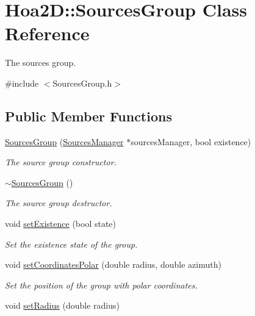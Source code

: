 \hypertarget{class_hoa2_d_1_1_sources_group}{\section{Hoa2\-D\-:\-:Sources\-Group Class Reference}
\label{class_hoa2_d_1_1_sources_group}
}


The sources group.  




{\ttfamily \#include $<$Sources\-Group.\-h$>$}

\subsection*{Public Member Functions}
\begin{DoxyCompactItemize}
\item 
\hyperlink{class_hoa2_d_1_1_sources_group_ac0a90e6831f790687a2f54d0b4603d84}{Sources\-Group} (\hyperlink{class_hoa2_d_1_1_sources_manager}{Sources\-Manager} $\ast$sources\-Manager, bool existence)
\begin{DoxyCompactList}\small\item\em The source group constructor. \end{DoxyCompactList}\item 
\hyperlink{class_hoa2_d_1_1_sources_group_a8032706e849ee56ef785e38654d6349d}{$\sim$\-Sources\-Group} ()
\begin{DoxyCompactList}\small\item\em The source group destructor. \end{DoxyCompactList}\item 
void \hyperlink{class_hoa2_d_1_1_sources_group_a1222a1761440a1121290710b67321fe8}{set\-Existence} (bool state)
\begin{DoxyCompactList}\small\item\em Set the existence state of the group. \end{DoxyCompactList}\item 
void \hyperlink{class_hoa2_d_1_1_sources_group_a07df80c3a4f3d5e3e7aa0554f5ad44fa}{set\-Coordinates\-Polar} (double radius, double azimuth)
\begin{DoxyCompactList}\small\item\em Set the position of the group with polar coordinates. \end{DoxyCompactList}\item 
void \hyperlink{class_hoa2_d_1_1_sources_group_a2fae46ab968c256f2dc81ea3edfc9d08}{set\-Radius} (double radius)

\end{DoxyCompactItemize}
